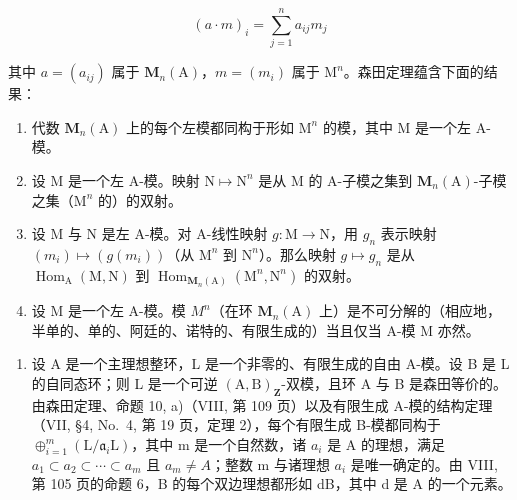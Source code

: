 \[
(a \cdot m) _ {i} = \sum_ {j = 1} ^ {n} a _ {i j} m _ {j}
\]

其中 \(a = (a_{ij})\) 属于 \(\mathbf{M}_n(\mathrm{A})\)，\(m = (m_i)\) 属于 \(\mathrm{M}^n\)。森田定理蕴含下面的结果：

\begin{enumerate}
\def\labelenumi{\alph{enumi})}
\item
  代数 \(\mathbf{M}_n(\mathrm{A})\) 上的每个左模都同构于形如 \(\mathrm{M}^n\) 的模，其中 \(\mathrm{M}\) 是一个左 A-模。
\item
  设 \(\mathrm{M}\) 是一个左 A-模。映射 \(\mathrm{N} \mapsto \mathrm{N}^n\) 是从 \(\mathrm{M}\) 的 A-子模之集到 \(\mathbf{M}_n(\mathrm{A})\)-子模之集（\(\mathrm{M}^n\) 的）的双射。
\item
  设 M 与 N 是左 A-模。对 A-线性映射 \(g: \mathrm{M} \to \mathrm{N}\)，用 \(g_{n}\) 表示映射 \((m_{i}) \mapsto (g(m_{i}))\)（从 \(\mathrm{M}^{n}\) 到 \(\mathrm{N}^{n}\)）。那么映射 \(g \mapsto g_{n}\) 是从 \(\operatorname{Hom}_{\mathrm{A}}(\mathrm{M}, \mathrm{N})\) 到 \(\operatorname{Hom}_{\mathbf{M}_{n}(\mathrm{A})}(\mathrm{M}^{n}, \mathrm{N}^{n})\) 的双射。
\item
  设 M 是一个左 A-模。模 \(M^{n}\)（在环 \(\mathbf{M}_{n}(\mathrm{A})\) 上）是不可分解的（相应地，半单的、单的、阿廷的、诺特的、有限生成的）当且仅当 A-模 M 亦然。
\end{enumerate}

\begin{enumerate}
\def\labelenumi{\arabic{enumi})}
\setcounter{enumi}{2}
\tightlist
\item
  设 A 是一个主理想整环，L 是一个非零的、有限生成的自由 A-模。设 B 是 L 的自同态环；则 L 是一个可逆 \((\mathrm{A},\mathrm{B})_{\mathbf{Z}}\)-双模，且环 A 与 B 是森田等价的。由森田定理、命题 10, a)（VIII, 第 109 页）以及有限生成 A-模的结构定理（VII, §4, No.~4, 第 19 页，定理 2），每个有限生成 B-模都同构于 \(\oplus_{i=1}^{m}(\mathrm{L}/\mathfrak{a}_{i}\mathrm{L})\)，其中 m 是一个自然数，诸 \(a_{i}\) 是 A 的理想，满足 \(a_{1} \subset a_{2} \subset \cdots \subset a_{m}\) 且 \(a_{m} \neq A\)；整数 m 与诸理想 \(a_{i}\) 是唯一确定的。由 VIII, 第 105 页的命题 6，B 的每个双边理想都形如 dB，其中 d 是 A 的一个元素。
\end{enumerate}

